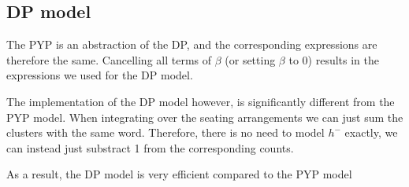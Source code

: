 \subsection{DP model}
The PYP is an abstraction of the DP, and the corresponding expressions are therefore the same. Cancelling all terms of $\beta$ (or setting $\beta$ to 0) results in the expressions we used for the DP model. 

The implementation of the DP model however, is significantly different from the PYP model. When integrating over the seating arrangements we can just sum the clusters with the same word. Therefore, there is no need to model $h^-$ exactly, we can instead just substract 1 from the corresponding counts.

As a result, the DP model is very efficient compared to the PYP model
